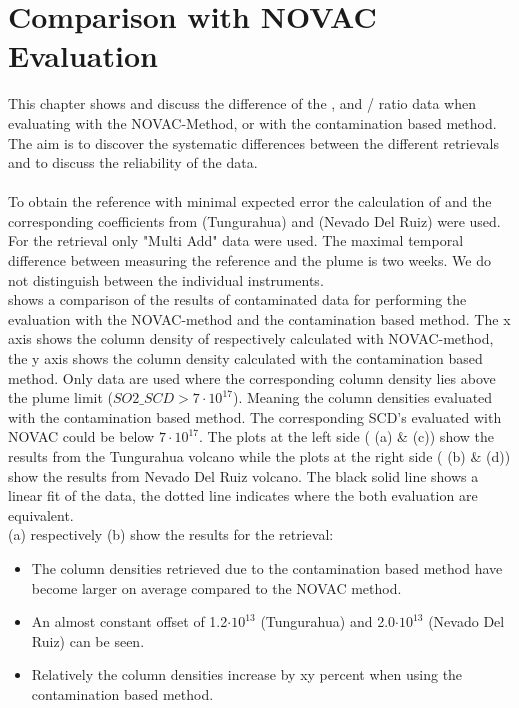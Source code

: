 \documentclass  [
  paper    = a4,
  BCOR     = 10mm,
  twoside,
  fontsize = 12pt,
  fleqn,
  toc      = bibnumbered,
  toc      = listofnumbered,
  numbers  = noendperiod,
  headings = normal,
  listof   = leveldown,
  version  = 3.03
]                                       {scrreprt}
\begin{document}
	\chapter{Comparison with NOVAC Evaluation}
	This chapter shows and discuss the difference of the ,   and /  ratio data when evaluating with the NOVAC-Method, or with the contamination based method.
	The aim is to discover the systematic differences between the different retrievals and to discuss the reliability of the data.\\
	\\
	To obtain the reference with minimal expected    error the calculation of  and the corresponding coefficients from  (Tungurahua) and  (Nevado Del Ruiz) were used. 
	For the retrieval only "Multi Add" data were used. The maximal temporal difference between measuring the reference and the plume is two weeks.
	We do not distinguish between the individual instruments. \\
	 shows a comparison of the results of contaminated data for performing the evaluation with the NOVAC-method and the contamination based method. The x axis shows the column density of   respectively   calculated with NOVAC-method, the y axis shows the column density calculated with the contamination based method. Only data are used where the corresponding   column density lies above the plume limit ($SO2\_SCD>7\cdot 10^{17}$). Meaning the column densities evaluated with the contamination based method. The corresponding   SCD's evaluated with NOVAC could be below $7\cdot 10^{17}$.
	The plots at the left side ( (a) \& (c)) show the results from the Tungurahua volcano while the plots at the right side ( (b) \& (d)) show the results from Nevado Del Ruiz volcano. The black solid line shows a linear fit of the data, the dotted line indicates where the both evaluation are equivalent.\\
	 (a) respectively (b) show the results for the   retrieval:
	\begin{itemize}
		\item The   column densities retrieved due to the contamination based method have become larger on average compared to the NOVAC method.
		\item An almost constant offset of 1.2$\cdot 10 ^{13}$ (Tungurahua) and 2.0$\cdot 10 ^{13}$ (Nevado Del Ruiz) can be seen.
		\item  Relatively the   column densities increase by xy percent when using the contamination based method.
	\end{itemize}
\end{document}
